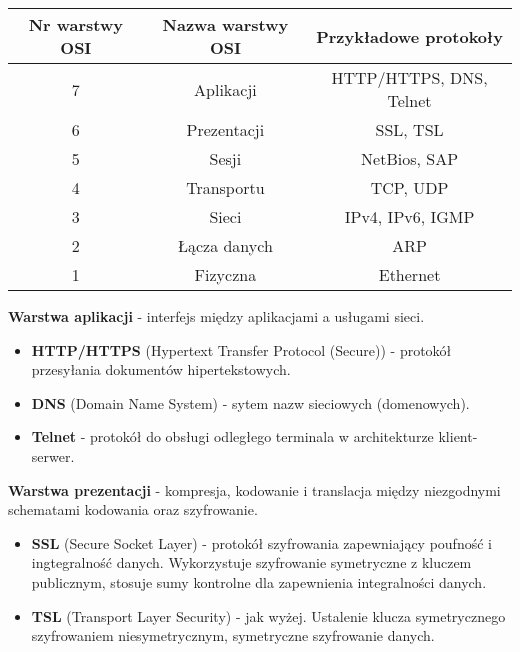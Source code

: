 \documentclass[main.tex]{subfiles}
\begin{document}
    \begin{table}[H]
        \begin{center}
            \begin{tabular}{|c|c|c| }
                \hline
                \textbf{Nr warstwy OSI} & \textbf{Nazwa warstwy OSI} & \textbf{Przykładowe protokoły}\\
                \hline
                \hline
                7 & Aplikacji & HTTP/HTTPS, DNS, Telnet\\
                \hline
                6 & Prezentacji & SSL, TSL\\
                \hline
                5 & Sesji & NetBios, SAP\\
                \hline
                4 & Transportu & TCP, UDP\\
                \hline
                3 & Sieci & IPv4, IPv6, IGMP\\
                \hline
                2 & Łącza danych & ARP\\
                \hline
                1 & Fizyczna & Ethernet\\
                \hline
            \end{tabular}
        \end{center}
    \end{table}

    \noindent \textbf{Warstwa aplikacji} - interfejs między aplikacjami a
    usługami sieci.
    \begin{itemize}[noitemsep]
        \item \textbf{HTTP/HTTPS} (Hypertext Transfer Protocol (Secure)) - protokół przesyłania dokumentów hipertekstowych.
        \item \textbf{DNS} (Domain Name System) - sytem nazw sieciowych (domenowych).
        \item \textbf{Telnet} - protokół do obsługi odległego terminala w architekturze klient-serwer.
    \end{itemize}

    \noindent \textbf{Warstwa prezentacji} - kompresja, kodowanie i
    translacja między niezgodnymi schematami kodowania oraz szyfrowanie.
    \begin{itemize}[noitemsep]
        \item \textbf{SSL} (Secure Socket Layer) - protokół szyfrowania zapewniający poufność i ingtegralność danych.
        Wykorzystuje szyfrowanie symetryczne z kluczem publicznym, stosuje sumy kontrolne dla zapewnienia integralności danych.
        \item \textbf{TSL} (Transport Layer Security) - jak wyżej. Ustalenie klucza symetrycznego szyfrowaniem niesymetrycznym,
        symetryczne szyfrowanie danych.
    \end{itemize}
\end{document}
